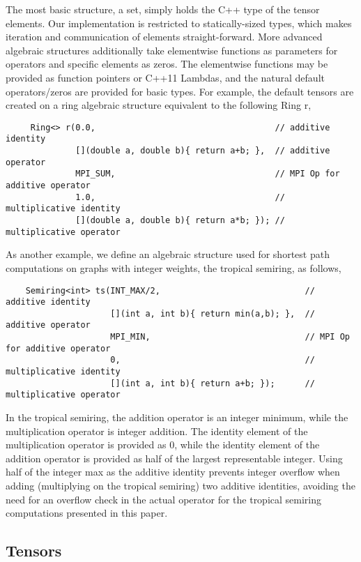 The most basic structure, a set, simply holds the C++ type of the tensor elements.
Our implementation is restricted to statically-sized types, which makes iteration and communication of elements straight-forward.
More advanced algebraic structures additionally take elementwise functions as parameters for operators and specific elements as zeros.
The elementwise functions may be provided as function pointers or C++11 Lambdas, and the natural default operators/zeros are provided for basic types.
For example, the default tensors are created on a ring algebraic structure equivalent to the following {\kwstyle Ring} {\CD r},
\begin{lstlisting}
     Ring<> r(0.0,                                    // additive identity
              [](double a, double b){ return a+b; },  // additive operator
              MPI_SUM,                                // MPI Op for additive operator
              1.0,                                    // multiplicative identity
              [](double a, double b){ return a*b; }); // multiplicative operator
\end{lstlisting}
As another example, we define an algebraic structure used for shortest path computations on graphs with integer weights, the tropical semiring, as follows,
\begin{lstlisting}
    Semiring<int> ts(INT_MAX/2,                             // additive identity
                     [](int a, int b){ return min(a,b); },  // additive operator
                     MPI_MIN,                               // MPI Op for additive operator
                     0,                                     // multiplicative identity
                     [](int a, int b){ return a+b; });      // multiplicative operator
\end{lstlisting}
In the tropical semiring, the addition operator is an integer minimum, while the multiplication operator is integer addition.
The identity element of the multiplication operator is provided as $0$, while the identity element of the addition operator is provided as half of the largest representable integer.
Using half of the integer max as the additive identity prevents integer overflow when adding (multiplying on the tropical semiring) two additive identities, avoiding the need for an overflow check in the actual operator for the tropical semiring computations presented in this paper. 





\subsection{Tensors}

